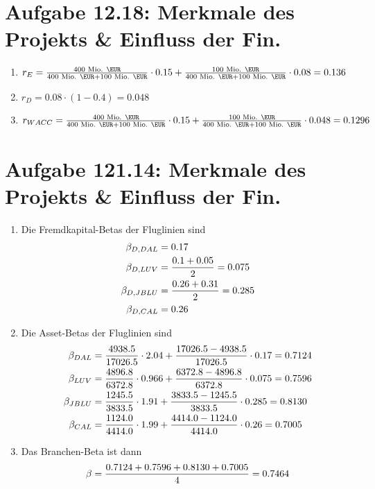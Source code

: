 \documentclass{article}
\begin{document}
	\section*{Aufgabe 12.18: Merkmale des Projekts \& Einfluss der Fin.}
	\begin{enumerate}[label=(\alph*)]
		\item $r_E = \frac{400\text{ Mio. \EUR}}{400\text{ Mio. \EUR} + 100\text{ Mio. \EUR}}\cdot 0.15 + \frac{100\text{ Mio. \EUR}}{400\text{ Mio. \EUR} + 100\text{ Mio. \EUR}}\cdot 0.08 = 0.136$
		\item $r_D = 0.08\cdot (1-0.4) = 0.048$
		\item $r_{WACC} = \frac{400\text{ Mio. \EUR}}{400\text{ Mio. \EUR} + 100\text{ Mio. \EUR}}\cdot 0.15 + \frac{100\text{ Mio. \EUR}}{400\text{ Mio. \EUR} + 100\text{ Mio. \EUR}}\cdot 0.048 = 0.1296$
	\end{enumerate}

	\section*{Aufgabe 121.14: Merkmale des Projekts \& Einfluss der Fin.}
	\begin{enumerate}[label=(\alph*)]
		\item Die Fremdkapital-Betas der Fluglinien sind
		\begin{align}
			\beta_{D,DAL} &= 0.17 \notag \\
			\beta_{D,LUV} &= \frac{0.1+0.05}{2}=0.075 \notag \\
			\beta_{D,JBLU} &= \frac{0.26+0.31}{2}=0.285 \notag \\
			\beta_{D,CAL} &= 0.26 \notag
		\end{align}
		\item Die Asset-Betas der Fluglinien sind
		\begin{align}
			\beta_{DAL} &= \frac{4938.5}{17026.5}\cdot 2.04 + \frac{17026.5-4938.5}{17026.5}\cdot 0.17 = 0.7124 \notag \\
			\beta_{LUV} &= \frac{4896.8}{6372.8}\cdot 0.966 + \frac{6372.8-4896.8}{6372.8}\cdot 0.075 = 0.7596 \notag \\
			\beta_{JBLU} &= \frac{1245.5}{3833.5}\cdot 1.91 + \frac{3833.5-1245.5}{3833.5}\cdot 0.285 = 0.8130 \notag \\
			\beta_{CAL} &= \frac{1124.0}{4414.0}\cdot 1.99 + \frac{4414.0-1124.0}{4414.0}\cdot 0.26 = 0.7005 \notag
		\end{align}
		\item Das Branchen-Beta ist dann
		\begin{align}
			\beta = \frac{0.7124 + 0.7596 + 0.8130 + 0.7005}{4} = 0.7464 \notag
		\end{align}
	\end{enumerate}
\end{document}
